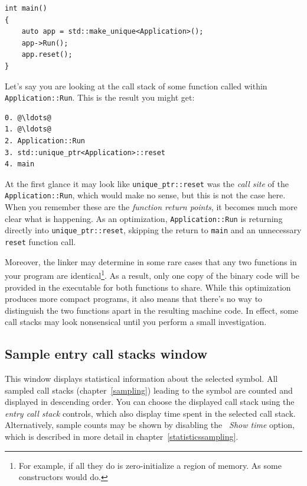 \documentclass[hidelinks,titlepage,a4paper]{article}
\begin{document}
\begin{lstlisting}
int main()
{
    auto app = std::make_unique<Application>();
    app->Run();
    app.reset();
}
\end{lstlisting}

Let's say you are looking at the call stack of some function called within \texttt{Application::Run}. This is the result you might get:

\begin{lstlisting}
0. @\ldots@
1. @\ldots@
2. Application::Run
3. std::unique_ptr<Application>::reset
4. main
\end{lstlisting}

At the first glance it may look like \texttt{unique\_ptr::reset} was the \emph{call site} of the \texttt{Application::Run}, which would make no sense, but this is not the case here. When you remember these are the \emph{function return points}, it becomes much more clear what is happening. As an optimization, \texttt{Application::Run} is returning directly into \texttt{unique\_ptr::reset}, skipping the return to \texttt{main} and an unnecessary \texttt{reset} function call.

Moreover, the linker may determine in some rare cases that any two functions in your program are identical\footnote{For example, if all they do is zero-initialize a region of memory. As some constructors would do.}. As a result, only one copy of the binary code will be provided in the executable for both functions to share. While this optimization produces more compact programs, it also means that there's no way to distinguish the two functions apart in the resulting machine code. In effect, some call stacks may look nonsensical until you perform a small investigation.

\subsection{Sample entry call stacks window}
\label{sampleparents}

This window displays statistical information about the selected symbol. All sampled call stacks (chapter~\ref{sampling}) leading to the symbol are counted and displayed in descending order. You can choose the displayed call stack using the \emph{entry call stack} controls, which also display time spent in the selected call stack. Alternatively, sample counts may be shown by disabling the \emph{\faStopwatch{}~Show time} option, which is described in more detail in chapter~\ref{statisticssampling}.
\end{document}
